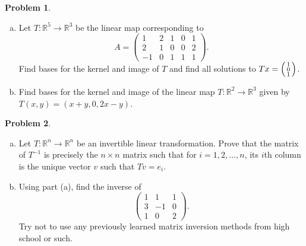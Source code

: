 \documentclass[11pt,oneside]{amsart}
\theoremstyle{definition}
\newtheorem{problem}{Problem}
\newcommand{\bR}{\mathbb{R}}
\newcommand*\colvec[1]{\begin{psmallmatrix}#1\end{psmallmatrix}}
\begin{document}
    \begin{problem}
        \leavevmode\begin{enumerate}[(a)]
            \item Let $T\colon\bR^5\to\bR^3$ be the linear map corresponding to
        \[A=\begin{pmatrix}1&2&1&0&1\\2&1&0&0&2\\-1&0&1&1&1\end{pmatrix}.\]
        Find bases for the kernel and image of $T$ and find all solutions to $Tx=\colvec{1\\0\\1}$.
        \item Find bases for the kernel and image of the linear map $T\colon\bR^2\to\bR^3$ given by $T(x,y)=(x+y,0,2x-y)$.
        \end{enumerate}
    \end{problem}
    
    \begin{problem}
        \leavevmode\begin{enumerate}[(a)]
            \item Let $T\colon\bR^n\to\bR^n$ be an invertible linear transformation. Prove that the matrix of $T^{-1}$ is precisely the $n\times n$ matrix such that for $i=1,2,\dots,n$, its $i$th column is the unique vector $v$ such that $Tv=e_i$.
            
            \item Using part (a), find the inverse of
            \[\begin{pmatrix}1&1&1\\3&-1&0\\1&0&2\end{pmatrix}.\]
            Try not to use any previously learned matrix inversion methods from high school or such.
        \end{enumerate}
    \end{problem}
\end{document}

